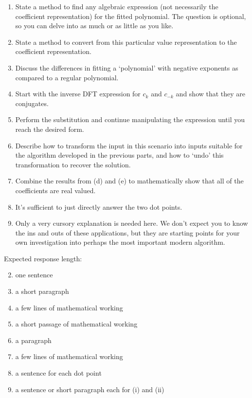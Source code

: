 \documentclass{article}
\begin{document}
\begin{rubric}
\begin{enumerate}
    \item State a method to find any algebraic expression (not necessarily the coefficient representation) for the fitted polynomial. The question is optional, so you can delve into as much or as little as you like.
    \item State a method to convert from this particular value representation to the coefficient representation.
    \item Discuss the differences in fitting a `polynomial' with negative exponents as compared to a regular polynomial.
    \item Start with the inverse DFT expression for $c_k$ and $c_{-k}$ and show that they are conjugates.
    \item Perform the substitution and continue manipulating the expression until you reach the desired form.
    \item Describe how to transform the input in this scenario into inputs suitable for the algorithm developed in the previous parts, and how to `undo' this transformation to recover the solution.
    \item Combine the results from (d) and (e) to mathematically show that all of the coefficients are real valued.
    \item It's sufficient to just directly answer the two dot points.
    \item Only a very cursory explanation is needed here. We don't expect you to know the ins and outs of these applications, but they are starting points for your own investigation into perhaps the most important modern algorithm.
\end{enumerate}

Expected response length:
\begin{enumerate}
    \setcounter{enumi}{1}
    \item one sentence
    \item a short paragraph
    \item a few lines of mathematical working
    \item a short passage of mathematical working
    \item a paragraph
    \item a few lines of mathematical working
    \item a sentence for each dot point
    \item a sentence or short paragraph each for (i) and (ii)
\end{enumerate}
\end{rubric}

\begin{solution}
\end{solution}
\end{document}
